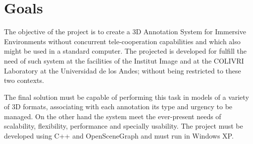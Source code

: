 \section{Goals}
The objective of the project is to create a 3D Annotation System for Immersive Environments without concurrent tele-cooperation capabilities and which also might be used in a standard computer. The projected is developed for fulfill the need of such system at the facilities of the Institut Image and at the COLIVRI Laboratory at the Universidad de los Andes; without being restricted to these two contexts.

The final solution must be capable of performing this task in models of a variety of 3D formats, associating with each annotation its type and urgency to be managed. On the other hand the system meet the ever-present needs of scalability, flexibility, performance and specially usability. The project must be developed using C++ and OpenSceneGraph and must run in Windows XP.